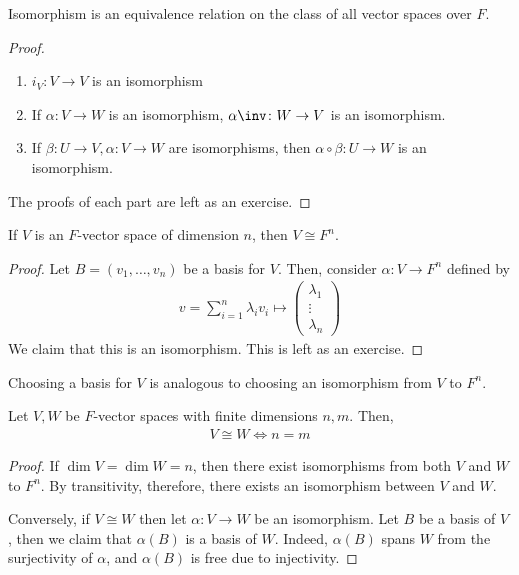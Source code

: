\begin{lemma}
    Isomorphism is an equivalence relation on the class of all vector spaces over $F$.
\end{lemma}

\begin{proof}
    \begin{enumerate}
        \item $i_V \colon V \to V$ is an isomorphism
        \item If $\alpha \colon V \to W$ is an isomorphism, $\alpha\inv \colon W \to V$ is an isomorphism.
        \item If $\beta \colon U \to V, \alpha \colon V \to W$ are isomorphisms, then $\alpha \circ \beta \colon U \to W$ is an isomorphism.
    \end{enumerate}
    The proofs of each part are left as an exercise.
\end{proof}

\begin{theorem}
    If $V$ is an $F$-vector space of dimension $n$, then $V \cong F^n$.
\end{theorem}

\begin{proof}
    Let $B = (v_1, \dots, v_n)$ be a basis for $V$.
    Then, consider $\alpha \colon V \to F^n$ defined by
    \begin{align*}
        v = \sum_{i=1}^n \lambda_i v_i \mapsto \begin{pmatrix}\lambda_1 \\ \vdots \\ \lambda_n \end{pmatrix}
    \end{align*}
    We claim that this is an isomorphism.
    This is left as an exercise.
\end{proof}

\begin{remark}
    Choosing a basis for $V$ is analogous to choosing an isomorphism from $V$ to $F^n$.
\end{remark}

\begin{theorem}
    Let $V, W$ be $F$-vector spaces with finite dimensions $n, m$.
    Then,
    \begin{align*}
        V \cong W \iff n = m
    \end{align*}
\end{theorem}
\begin{proof}
    If $\dim V = \dim W = n$, then there exist isomorphisms from both $V$ and $W$ to $F^n$.
    By transitivity, therefore, there exists an isomorphism between $V$ and $W$.

    Conversely, if $V \cong W$ then let $\alpha \colon V \to W$ be an isomorphism.
    Let $B$ be a basis of $V$, then we claim that $\alpha(B)$ is a basis of $W$.
    Indeed, $\alpha(B)$ spans $W$ from the surjectivity of $\alpha$, and $\alpha(B)$ is free due to injectivity.
\end{proof}

